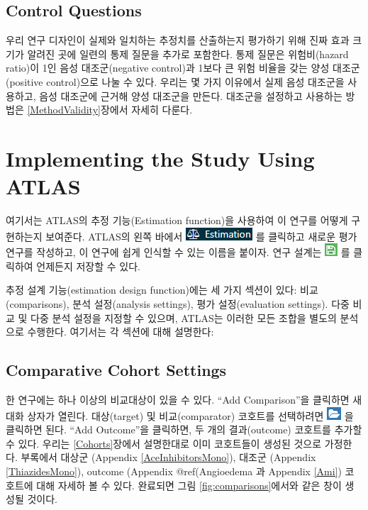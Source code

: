 \documentclass[11pt]{book}
\theoremstyle{definition}
\theoremstyle{definition}
\theoremstyle{definition}
\theoremstyle{remark}
\begin{document}
\subsection{Control Questions}\label{control-questions}

우리 연구 디자인이 실제와 일치하는 추정치를 산출하는지 평가하기 위해
진짜 효과 크기가 알려진 곳에 일련의 통제 질문을 추가로 포함한다. 통제
질문은 위험비(hazard ratio)이 1인 음성 대조군(negative control)과 1보다
큰 위험 비율을 갖는 양성 대조군(positive control)으로 나눌 수 있다.
우리는 몇 가지 이유에서 실제 음성 대조군을 사용하고, 음성 대조군에
근거해 양성 대조군을 만든다. 대조군을 설정하고 사용하는 방법은
\ref{MethodValidity}장에서 자세히 다룬다.

\section{Implementing the Study Using ATLAS}\label{PleAtlas}

여기서는 ATLAS의 추정 기능(Estimation function)을 사용하여 이 연구를
어떻게 구현하는지 보여준다. ATLAS의 왼쪽 바에서
\includegraphics{images/PopulationLevelEstimation/estimation.png} 를
클릭하고 새로운 평가 연구를 작성하고, 이 연구에 쉽게 인식할 수 있는
이름을 붙이자. 연구 설계는
\includegraphics{images/PopulationLevelEstimation/save.png} 를 클릭하여
언제든지 저장할 수 있다.

추정 설계 기능(estimation design function)에는 세 가지 섹션이 있다:
비교(comparisons), 분석 설정(analysis settings), 평가 설정(evaluation
settings). 다중 비교 및 다중 분석 설정을 지정할 수 있으며, ATLAS는
이러한 모든 조합을 별도의 분석으로 수행한다. 여기서는 각 섹션에 대해
설명한다:

\subsection{Comparative Cohort Settings}\label{ComparisonSettings}

한 연구에는 하나 이상의 비교대상이 있을 수 있다. ``Add Comparison''을
클릭하면 새 대화 상자가 열린다. 대상(target) 및 비교(comparator)
코호트를 선택하려면
\includegraphics{images/PopulationLevelEstimation/open.png} 을 클릭하면
된다. ``Add Outcome''을 클릭하면, 두 개의 결과(outcome) 코호트를 추가할
수 있다. 우리는 \ref{Cohorts}장에서 설명한대로 이미 코호트들이 생성된
것으로 가정한다. 부록에서 대상군 (Appendix \ref{AceInhibitorsMono}),
대조군 (Appendix \ref{ThiazidesMono}), outcome (Appendix @ref(Angioedema
과 Appendix \ref{Ami}) 코호트에 대해 자세하 볼 수 있다. 완료되면 그림
\ref{fig:comparisons}에서와 같은 창이 생성될 것이다.
\end{document}
